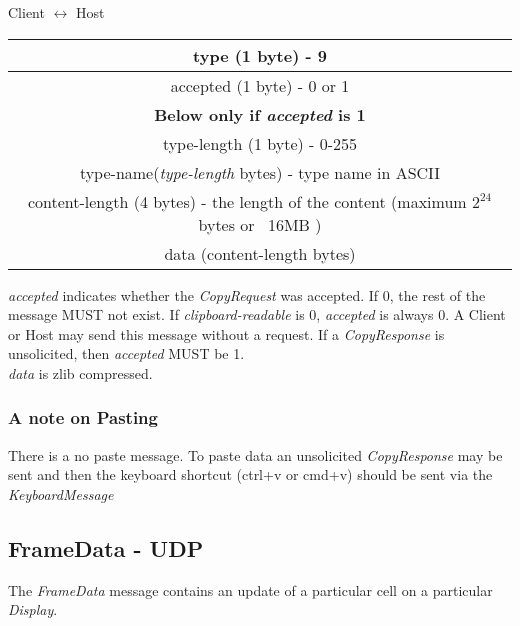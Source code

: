 \documentclass{article}
\begin{document}
    \begin{center}
        Client $\leftrightarrow$ Host\\
        \begin{tabular}{|c|}
            \hline
            type (1 byte) - 9                                                                       \\
            \hline
            accepted (1 byte) - 0 or 1                                                              \\
            \hline
            \textbf{Below only if \emph{accepted} is 1}                                             \\
            \hline
            type-length (1 byte) - 0-255                                                            \\
            \hline
            type-name(\emph{type-length} bytes) - type name in ASCII                                \\
            \hline
            content-length (4 bytes) - the length of the content (maximum $2^{24}$ bytes or ~16MB ) \\
            \hline
            data (content-length bytes)                                                             \\
            \hline
        \end{tabular}
    \end{center}

    \emph{accepted} indicates whether the \emph{CopyRequest} was accepted. If 0, the rest of the message MUST not exist.
    If \emph{clipboard-readable} is 0, \emph{accepted} is always 0. A Client or Host may send this message without a request.
    If a \emph{CopyResponse} is unsolicited, then \emph{accepted} MUST be 1.\\

    \emph{data} is zlib compressed.

    \subsubsection{A note on Pasting}

    There is a no paste message. To paste data an unsolicited \emph{CopyResponse} may be sent and then the keyboard
    shortcut (ctrl+v or cmd+v) should be sent via the \emph{KeyboardMessage}

    \subsection{FrameData - UDP}
    The \emph{FrameData} message contains an update of a particular cell on a particular \emph{Display}.
\end{document}
